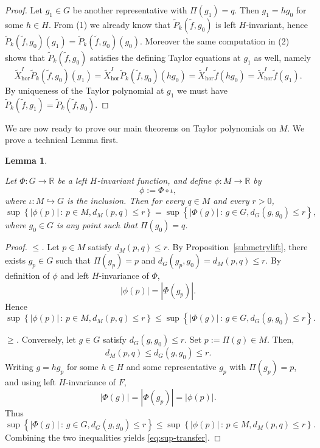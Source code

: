 \documentclass[12pt]{amsart}
\newtheorem{lemma}{Lemma}[section]
\begin{document}
\begin{proof}
\medskip{}
Let \(g_1\in G\) be another representative with \(\Pi(g_1)=q\).  Then \(g_1 = h g_0\) for some \(h\in H\).
From (1) we already know that \(\tilde P_k(\tilde f,g_0)\) is left \(H\)-invariant, hence
\(\tilde P_k(\tilde f,g_0)(g_1)=\tilde P_k(\tilde f,g_0)(g_0)\).  Moreover the same computation in (2) shows that \(\tilde P_k(\tilde f,g_0)\) satisfies the defining Taylor equations at \(g_1\) as well, namely
\[
\tilde X_{\mathrm{hor}}^I \tilde P_k(\tilde f,g_0)(g_1)
= \tilde X_{\mathrm{hor}}^I \tilde P_k(\tilde f,g_0)(hg_0)
= \tilde X_{\mathrm{hor}}^I \tilde f(hg_0)
= \tilde X_{\mathrm{hor}}^I \tilde f(g_1).
\]
By uniqueness of the Taylor polynomial at \(g_1\) we must have
\(\tilde P_k(\tilde f,g_1)=\tilde P_k(\tilde f,g_0)\).  
\end{proof}

We are now ready to prove our main theorems on Taylor polynomials on $M$. We prove a technical Lemma first.

\begin{lemma}
\label{lem:sup-transfer}

Let $\Phi:G\to\mathbb R$ be a left $H$-invariant function, and define
$\phi:M\to\mathbb R$ by
\[
\phi := \Phi\circ \iota,
\]
where $\iota:M\hookrightarrow G$ is the inclusion.
Then for every $q\in M$ and every $r>0$,
\begin{equation}\label{eq:sup-transfer}
\sup \left\{|\phi(p)|\,:\, p\in M, d_M(p,q)\le r\right\}
=
\sup \left\{|\Phi(g)|\,:\,g\in G, d_G(g,g_0)\le r\right\},
\end{equation}
where $g_0\in G$ is any point such that $\Pi(g_0)=q$.
\end{lemma}

\begin{proof}
\medskip\noindent
\emph{$\leq$.}
Let $p\in M$ satisfy $d_M(p,q)\le r$.
By Proposition~\ref{submetrylift}, there exists
$g_p\in G$ such that
\(
\Pi(g_p)=p\) and \(
d_G(g_p,g_0)=d_M(p,q)\le r.
\)
By definition of $\phi$ and left $H$-invariance of $\Phi$,
\[
|\phi(p)| = |\Phi(g_p)|.
\]
Hence
\[
\sup \left\{|\phi(p)|\,:\, p\in M, d_M(p,q)\le r\right\}
\le
\sup \left\{|\Phi(g)|\,:\,g\in G, d_G(g,g_0)\le r\right\}.
\]

\medskip\noindent
\emph{$\geq$.}
Conversely, let $g\in G$ satisfy $d_G(g,g_0)\le r$.
Set $p:=\Pi(g)\in M$.  Then, 
\[
d_M(p,q)\le d_G(g,g_0)\le r.
\]
Writing $g = h g_p$ for some $h\in H$ and some representative $g_p$ with $\Pi(g_p)=p$,
and using left $H$-invariance of $F$, 
\[
|\Phi(g)| = |\Phi(g_p)| = |\phi(p)|.
\]
Thus
\[
\sup \left\{|\Phi(g)|\,:\,g\in G, d_G(g,g_0)\le r \right\}
\le
\sup \left\{|\phi(p)|\,:\,p\in M, d_M(p,q)\le r \right\}.
\]
Combining the two inequalities yields \eqref{eq:sup-transfer}.
\end{proof}
\end{document}
